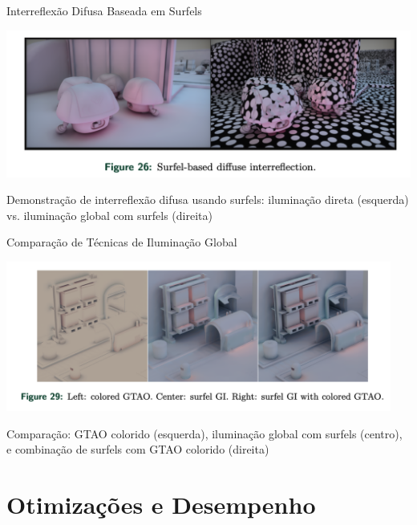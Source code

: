 \documentclass[aspectratio=169,xcolor=table]{beamer}
\begin{document}
\begin{frame}{Interreflexão Difusa Baseada em Surfels}
    \begin{center}
        \includegraphics[height=0.7\textheight]{surfel-based-diffuse-interreflection}
    \end{center}
    \begin{center}
        \small{Demonstração de interreflexão difusa usando surfels: iluminação direta (esquerda) vs. iluminação global com surfels (direita)}
    \end{center}
\end{frame}

\begin{frame}{Comparação de Técnicas de Iluminação Global}
    \begin{center}
        \includegraphics[width=0.95\textwidth]{surfel-comparacao}
    \end{center}
    \begin{center}
        \small{Comparação: GTAO colorido (esquerda), iluminação global com surfels (centro),\\
        e combinação de surfels com GTAO colorido (direita)}
    \end{center}
\end{frame}

\section{Otimizações e Desempenho}
\end{document}
